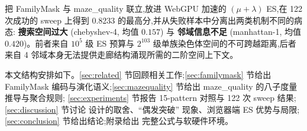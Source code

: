 把 FamilyMask 与 maze\_quality 联立,放进 WebGPU 加速的 $(\mu{+}\lambda)$ ES,在 122 次成功的
sweep 上得到 0.8233 的最高分,并从失败样本中分离出两类机制不同的病态:
\textbf{搜索空间过大} (chebyshev-4, 均值 $0.157$) 与 \textbf{邻域信息不足} (manhattan-1,
均值 $0.420$)。前者来自 $10^5$ 级 ES 预算与 $2^{103}$ 级单族染色体空间的不可跨越距离,后者来自
4 邻域本身无法提供走廊结构涌现所需的二阶空间上下文。

本文结构安排如下。\ref{sec:related} 节回顾相关工作;\ref{sec:familymask} 节给出 FamilyMask
编码与演化语义;\ref{sec:mazequality} 节给出 maze\_quality 的八子度量推导与聚合规则;
\ref{sec:experiments} 节报告 15-pattern 对照与 122 次 sweep 结果;\ref{sec:discussion} 节讨论
设计的取舍、``偶发突破'' 现象、浏览器端 ES 优势与局限;\ref{sec:conclusion} 节给出结论;附录给出
完整公式与软硬件环境。
